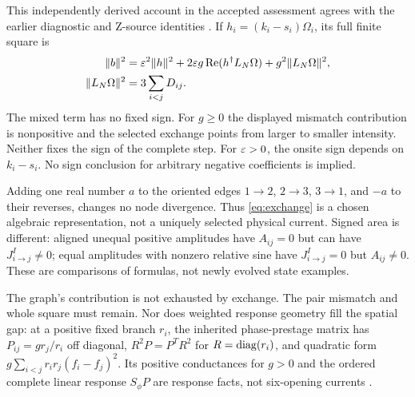 This independently derived account in the accepted assessment agrees with the earlier diagnostic and Z-source identities \cite{nrg,zmethods,assessment}. If $h_i=(k_i-s_i)\Omega_i$, its full finite square is
\begin{align}
 \|b\|^2&=\varepsilon^2\|h\|^2+2\varepsilon g\operatorname{Re}(h^\dagger L_N\Omega)
                 +g^2\|L_N\Omega\|^2,\label{eq:square}\\
 \|L_N\Omega\|^2&=3\sum_{i<j}D_{ij}.\notag
\end{align}
The mixed term has no fixed sign. For $g\ge0$ the displayed mismatch contribution is nonpositive and the selected exchange points from larger to smaller intensity. Neither fixes the sign of the complete step. For $\varepsilon>0$, the onsite sign depends on $k_i-s_i$. No sign conclusion for arbitrary negative coefficients is implied.

\begin{remark}\label{rem:cycle}
Adding one real number $a$ to the oriented edges $1\to2$, $2\to3$, $3\to1$, and $-a$ to their reverses, changes no node divergence. Thus \eqref{eq:exchange} is a chosen algebraic representation, not a uniquely selected physical current. Signed area is different: aligned unequal positive amplitudes have $A_{ij}=0$ but can have $J^I_{i\to j}\ne0$; equal amplitudes with nonzero relative sine have $J^I_{i\to j}=0$ but $A_{ij}\ne0$. These are comparisons of formulas, not newly evolved state examples.
\end{remark}

The graph's contribution is not exhausted by exchange. The pair mismatch and whole square must remain. Nor does weighted response geometry fill the spatial gap: at a positive fixed branch $r_i$, the inherited phase-prestage matrix has $P_{ij}=gr_j/r_i$ off diagonal, $R^2P=P^TR^2$ for $R=\operatorname{diag}(r_i)$, and quadratic form $g\sum_{i<j}r_ir_j(f_i-f_j)^2$. Its positive conductances for $g>0$ and the ordered complete linear response $S_\phi P$ are response facts, not six-opening currents \cite[response chapter, weighted geometry]{nrg}.

